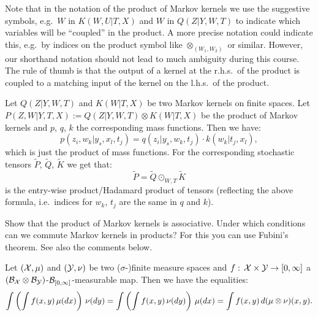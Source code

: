 \begin{Rem}
    Note that in the notation of the product of Markov kernels we use the suggestive symbols, e.g.\ $W$ in $K(W,U|T,X)$ and $W$ in $Q(Z|Y,W,T)$ to indicate which variables will be ``coupled'' in the product.
    A more precise notation could indicate this, e.g.\ by indices on the product symbol like $\otimes_{(W_1,W_2)}$ or similar. However, our shorthand notation should not lead to much ambiguity during this course.
    The rule of thumb is that the output of a kernel at the r.h.s.\ of the product is coupled to a matching input of the kernel on the l.h.s.\ of the product.
\end{Rem}

\begin{Eg}
    Let $Q(Z|Y,W,T)$ and $K(W|T,X)$ be two Markov kernels on finite spaces.
    Let $P(Z,W|Y,T,X) := Q(Z|Y,W,T) \otimes K(W|T,X)$ be the product of Markov kernels and $p$, $q$, $k$ the corresponding mass functions.
    Then we have:
    \[  p(z_i,w_k|y_s,x_l,t_j) = q(z_i|y_s,w_k,t_j) \cdot k(w_k|t_j,x_l),  \]
    which is just the product of mass functions.
    For the corresponding stochastic tensors $\tilde P$, $\tilde Q$, $\tilde K$ we get that:    
    \[\tilde P = \tilde Q \odot_{W,T} \tilde K\]
    is the entry-wise product/Hadamard product of tensors (reflecting the above formula, i.e.\ indices for $w_k$, $t_j$  are the same in $q$ and $k$).
\end{Eg}

\begin{Exc}\label{mk-product-commutes}
    Show that the product of Markov kernels is associative.
    Under which conditions can we commute Markov kernels in products?
    For this you can use Fubini's theorem. See also the comments below.
\end{Exc}

\begin{Thm}\label{fubini}
    Let $(\mathcal{X},\mu)$ and $(\mathcal{Y},\nu)$ be two ($\sigma$-)finite measure spaces and $f:\,\mathcal{X} \times \mathcal{Y} \to [0,\infty]$ a $(\mathcal{B}_{\mathcal{X}}\otimes\mathcal{B}_{\mathcal{Y}})$-$\mathcal{B}_{[0,\infty]}$-measurable map.
    Then we have the equalities:
    \[ \int\left (\int f(x,y)\, \mu(dx)\right )\,\nu(dy) = \int\left (\int f(x,y)\, \nu(dy)\right )\,\mu(dx) = \int f(x,y) \, d(\mu\otimes\nu)(x,y). \]
\end{Thm}

